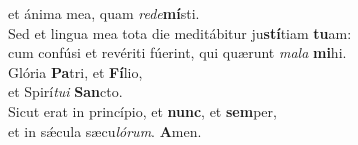 \evenverse et ánima mea, quam \textit{re}\textit{de}\textbf{mí}sti.\\
\oddverse Sed et lingua mea tota die meditábitur ju\textbf{stí}tiam \textbf{tu}am:~\*\\
\oddverse cum confúsi et revériti fúerint, qui quærunt \textit{ma}\textit{la} \textbf{mi}hi.\\
\evenverse Glória \textbf{Pa}tri, et \textbf{Fí}lio,~\*\\
\evenverse et Spirí\textit{tu}\textit{i} \textbf{San}cto.\\
\oddverse Sicut erat in princípio, et \textbf{nunc}, et \textbf{sem}per,~\*\\
\oddverse et in sǽcula sæcu\textit{ló}\textit{rum}. \textbf{A}men.\\
